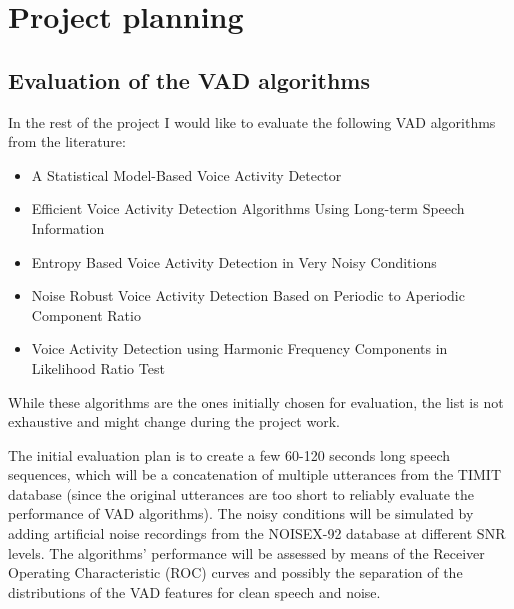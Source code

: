 
\chapter{Project planning} %

\label{Chapter3i} %



\section{Evaluation of the VAD algorithms}

In the rest of the project I would like to evaluate the following VAD algorithms from the literature:

\begin{itemize}
\item A Statistical Model-Based Voice Activity Detector \cite{Sohn}
\item Efficient Voice Activity Detection Algorithms Using Long-term Speech Information \cite{LTSD}
\item Entropy Based Voice Activity Detection in Very Noisy Conditions \citep{Renevey}
\item Noise Robust Voice Activity Detection Based on Periodic to Aperiodic Component Ratio \cite{PARADE}
\item Voice Activity Detection using Harmonic Frequency Components in Likelihood Ratio Test \cite{Tan}
\end{itemize}

While these algorithms are the ones initially chosen for evaluation, the list is not exhaustive and might change during the project work.

The initial evaluation plan is to create a few 60-120 seconds long speech sequences, which will be a concatenation of multiple utterances from the TIMIT database (since the original utterances are too short to reliably evaluate the performance of VAD algorithms). The noisy conditions will be simulated by adding artificial noise recordings from the NOISEX-92 database at different SNR levels. The algorithms' performance will be assessed by means of the Receiver Operating Characteristic (ROC) curves and possibly the separation of the distributions of the VAD features for clean speech and noise.

